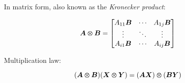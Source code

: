 In matrix form, also known as the \textit{Kronecker product}:

\begin{equation}\label{eq:tensor-product}
    \bm{A} \varotimes \bm{B} =
    \begin{bmatrix}
        A_{1 1} \bm{B} & \cdots & A_{1 j} \bm{B} \\
        \vdots & \ddots & \vdots \\
        A_{i 1} \bm{B} & \cdots & A_{i j} \bm{B}
    \end{bmatrix}
\end{equation}

Multiplication law:

\begin{equation}\label{eq:tensor-product-multiplication}
    (\bm{A} \varotimes \bm{B}) (\bm{X} \varotimes \bm{Y}) = (\bm{A} \bm{X}) \varotimes (\bm{B} \bm{Y})
\end{equation}




